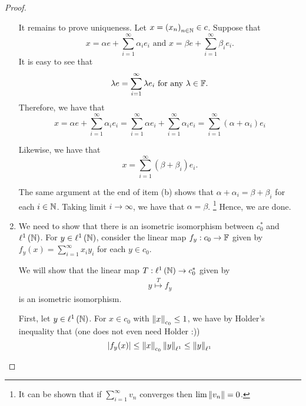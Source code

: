 \begin{proof}
\begin{enumerate}[label=(\alph*)]
    It remains to prove uniqueness. Let $x= \left( x_{n} \right)_{n\in \mathbb N} \in c$. Suppose that 
    \begin{equation*}
	x=\alpha e + \sum_{i=1}^{\infty} \alpha_{i} e_{i} \text{ and } x= \beta e + \sum_{i=1}^{\infty} \beta_{i} e_{i}.
    \end{equation*}
It is easy to see that 
\begin{equation*}
    \lambda e = \sum_{i=1}^{\infty} \lambda e_{i} \text{ for any } \lambda \in \mathbb F.
\end{equation*}
Therefore, we have that
\begin{equation*}
    x=\alpha e + \sum_{i=1}^{\infty} \alpha_{i} e_{i} =  \sum_{i=1}^{\infty} \alpha e_{i} +  \sum_{i=1}^{\infty} \alpha_{i} e_{i}  = \sum_{i=1}^{\infty} \left( \alpha + \alpha_{i} \right)e_{i}
\end{equation*}

Likewise, we have that 
\begin{equation*}
    x=\sum_{i=1}^{\infty} \left( \beta + \beta_{i} \right) e_{i} .
\end{equation*}

The same argument at the end of item (b) shows that $\alpha + \alpha_{i} = \beta + \beta_{i}$ for each $i \in \mathbb N$. Taking limit $i\to \infty$, we have that $\alpha = \beta$. \footnote{It can be shown that if $\sum_{i=1}^{\infty} v_{n}$ converges then $\lim \left\lVert v_{n} \right\rVert = 0$.} Hence, we are done.
 \item We need to show that there is an isometric isomorphism between $c_{0}^{*}$ and $\ell ^{1} \left( \mathbb N \right)$. For $y \in \ell ^{1} \left( \mathbb N \right)$, consider the linear map $f_{y} : c_{0} \to \mathbb F$ given by $f_{y}(x) = \sum_{i=1}^{\infty} x_{i}y_{i}$ for each $y\in c_{0}$.

     We will show that the linear map $T: \ell ^{1} \left( \mathbb N \right) \to c_{0}^{*}$ given by
     \begin{align*}
	 y \stackrel{T}{\longmapsto} f_{y}
     \end{align*}
     is an isometric isomorphism.

 First, let $y\in \ell ^{1} \left( \mathbb N \right)$. For $x\in c_{0}$ with $\left\lVert x \right\rVert_{c_{0}} \le 1$, we have by Holder's inequality that (one does not even need Holder :))
     \begin{equation*}
	 \left\lvert f_{y} (x) \right\rvert \le \left\lVert x \right\rVert_{c_{0}} \left\lVert y \right\rVert_{\ell^{1}} \le \left\lVert y \right\rVert_{\ell^{1}}
     \end{equation*}


\end{enumerate}
\end{proof}
